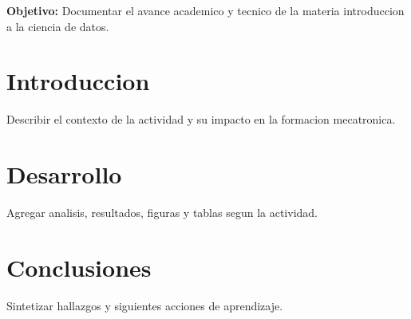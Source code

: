 \documentclass[spanish,letterpaper,oneside]{article}
\begin{document}
\templatePortrait
\templatePagecfg
\onehalfspacing

\begin{abstractd}
\textbf{Objetivo:} Documentar el avance academico y tecnico de la materia introduccion a la ciencia de datos.
\end{abstractd}

\templateIndex
\templateFinalcfg

\section{Introduccion}
Describir el contexto de la actividad y su impacto en la formacion mecatronica.

\section{Desarrollo}
Agregar analisis, resultados, figuras y tablas segun la actividad.

\section{Conclusiones}
Sintetizar hallazgos y siguientes acciones de aprendizaje.



\end{document}
